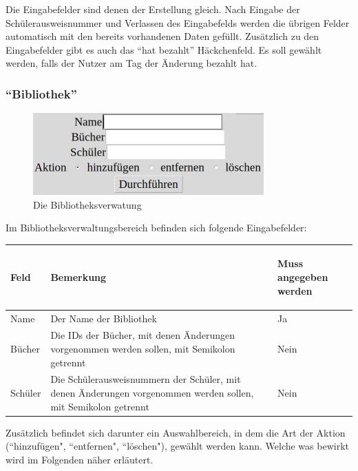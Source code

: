 Die Eingabefelder sind denen der Erstellung gleich. Nach Eingabe der Schülerausweisnummer und Verlassen des Eingabefelds werden die übrigen Felder automatisch mit den bereits vorhandenen Daten gefüllt.
Zusätzlich zu den Eingabefelder gibt es auch das ``hat bezahlt'' Häckchenfeld. Es soll gewählt werden, falls der Nutzer am Tag der Änderung bezahlt hat.


\subsubsection{``Bibliothek''}
\label{subsubsec:detail:edit:library}
\begin{figure}\includegraphics{images/gui2/edit_library.jpg}\caption{Die Bibliotheksverwatung}\label{fig:edit_library}\end{figure}

Im Bibliotheksverwaltungsbereich befinden sich folgende Eingabefelder:

\begin{tabular}{|p{}|p{}|p{}|}\hline
\begin{center}Feld\end{center} & \begin{center}Bemerkung\end{center} & \begin{center}Muss angegeben werden\end{center}\\
\hline
Name & Der Name der Bibliothek & Ja\\
\hline
Bücher & Die IDs der Bücher, mit denen Änderungen vorgenommen werden sollen, mit Semikolon getrennt & Nein\\
\hline
Schüler & Die Schülerausweisnummern der Schüler, mit denen Änderungen vorgenommen werden sollen, mit Semikolon getrennt & Nein\\
\hline
\end{tabular}

Zusätzlich befindet sich darunter ein Auswahlbereich, in dem die Art der Aktion (``hinzufügen", ``entfernen", ``löschen"), gewählt werden kann. Welche was bewirkt wird im Folgenden näher erläutert.

